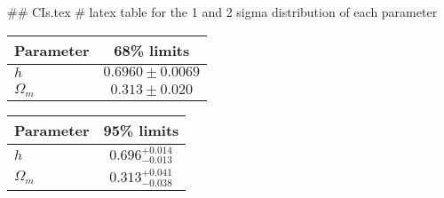 ## CIs.tex
# latex table for the 1 and 2 sigma distribution of each parameter

\begin{tabular} { l  c}
 Parameter &  68\% limits\\
\hline
{\boldmath$h              $} & $0.6960\pm 0.0069          $\\
{\boldmath$\Omega_m       $} & $0.313\pm 0.020            $\\
\hline
\end{tabular}

\begin{tabular} { l  c}
 Parameter &  95\% limits\\
\hline
{\boldmath$h              $} & $0.696^{+0.014}_{-0.013}   $\\
{\boldmath$\Omega_m       $} & $0.313^{+0.041}_{-0.038}   $\\
\hline
\end{tabular}
